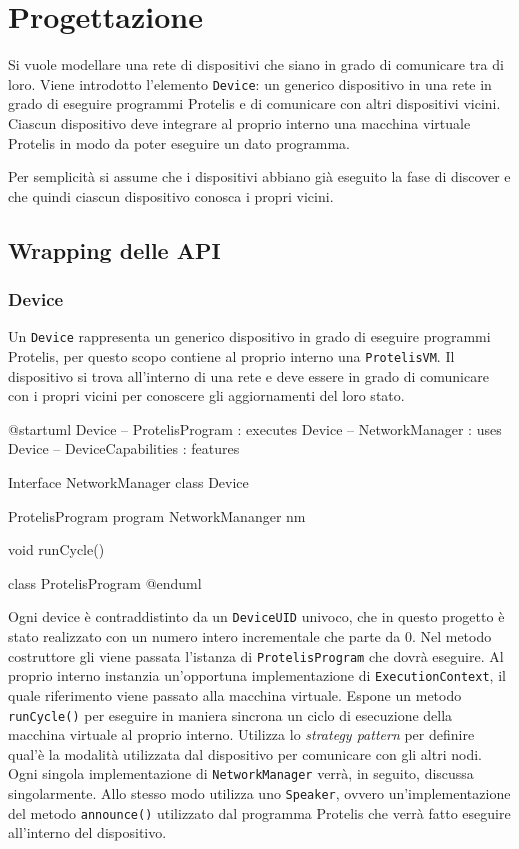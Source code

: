 \section{Progettazione}

Si vuole modellare una rete di dispositivi che siano in grado di comunicare tra
di loro. Viene introdotto l'elemento \texttt{Device}: un generico dispositivo in una rete
in grado di eseguire programmi Protelis e di comunicare con altri dispositivi
vicini. Ciascun dispositivo deve integrare al proprio interno una macchina
virtuale Protelis in modo da poter eseguire un dato programma.

Per semplicità si assume che i dispositivi abbiano già eseguito la fase di
discover e che quindi ciascun dispositivo conosca i propri vicini.

\subsection{Wrapping delle API}

\subsubsection{Device}
Un \texttt{Device} rappresenta un generico dispositivo in grado di eseguire programmi
Protelis, per questo scopo contiene al proprio interno una \texttt{ProtelisVM}. Il dispositivo si trova all'interno di una rete e deve essere in grado
di comunicare con i propri vicini per conoscere gli aggiornamenti del loro
stato.

\begin{center}
  \begin{plantuml}
    @startuml
    Device -- ProtelisProgram : executes
    Device -- NetworkManager : uses
    Device -- DeviceCapabilities : features

    Interface NetworkManager
    class Device {
      ProtelisProgram program
      NetworkMananger nm

      void runCycle()
    }

    class ProtelisProgram { }
    @enduml
  \end{plantuml}
\end{center}

Ogni device è contraddistinto da un \texttt{DeviceUID} univoco, che in questo
progetto è stato realizzato con un numero intero incrementale che parte da
0. Nel metodo costruttore gli viene passata l'istanza di
\texttt{ProtelisProgram} che dovrà eseguire. Al proprio interno instanzia
un'opportuna implementazione di \texttt{ExecutionContext}, il quale riferimento
viene passato alla macchina virtuale. Espone un metodo \texttt{runCycle()} per
eseguire in maniera sincrona un ciclo di esecuzione della macchina virtuale al
proprio interno. Utilizza lo \textit{strategy pattern} per definire qual'è la
modalità utilizzata dal dispositivo per comunicare con gli altri nodi. Ogni
singola implementazione di \texttt{NetworkManager} verrà, in seguito, discussa
singolarmente. Allo stesso modo utilizza uno \texttt{Speaker}, ovvero
un'implementazione del metodo \texttt{announce()} utilizzato dal programma
Protelis che verrà fatto eseguire all'interno del dispositivo.



